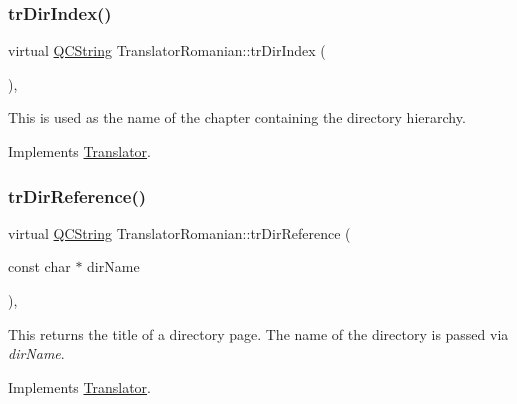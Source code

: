 \mbox{\label{class_translator_romanian_ab2b4a2f0dd42652b1ef100b4dd8a65a3}} 
\subsubsection{\texorpdfstring{trDirIndex()}{trDirIndex()}}
{\footnotesize\ttfamily virtual \mbox{\hyperlink{class_q_c_string}{Q\+C\+String}} Translator\+Romanian\+::tr\+Dir\+Index (\begin{DoxyParamCaption}{ }\end{DoxyParamCaption})\hspace{0.3cm}{\ttfamily [inline]}, {\ttfamily [virtual]}}

This is used as the name of the chapter containing the directory hierarchy. 

Implements \mbox{\hyperlink{class_translator}{Translator}}.

\mbox{\label{class_translator_romanian_a13510f8b11f738f66dd169e232f1c4dc}} 
\subsubsection{\texorpdfstring{trDirReference()}{trDirReference()}}
{\footnotesize\ttfamily virtual \mbox{\hyperlink{class_q_c_string}{Q\+C\+String}} Translator\+Romanian\+::tr\+Dir\+Reference (\begin{DoxyParamCaption}\item[{const char $\ast$}]{dir\+Name }\end{DoxyParamCaption})\hspace{0.3cm}{\ttfamily [inline]}, {\ttfamily [virtual]}}

This returns the title of a directory page. The name of the directory is passed via {\itshape dir\+Name}. 

Implements \mbox{\hyperlink{class_translator}{Translator}}.

\mbox{\label{class_translator_romanian_a715d600321865daf698ecbfa6f420617}} 
